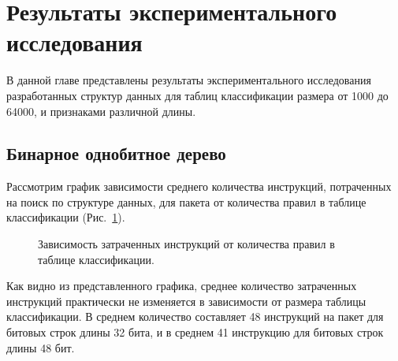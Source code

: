 \documentclass[a4paper, 12pt, titlepage, finall]{extreport}
\begin{document}
    \section{Результаты экспериментального исследования}
        В данной главе представлены результаты экспериментального исследования разработанных структур данных для таблиц классификации размера от 1000 до 64000, 
        и признаками различной длины.
        \subsection{Бинарное однобитное дерево}
            Рассмотрим график зависимости среднего количества инструкций, потраченных на поиск по структуре данных, для пакета от количества правил в таблице классификации (Рис.~\ref{graph:btinst}).
            \begin{figure}[!htbp]
                \centering
                \captionsetup{justification=centering}
                \caption{Зависимость затраченных инструкций от количества правил в таблице классификации.}
                \label{graph:btinst}
            \end{figure}
            Как видно из представленного графика, среднее количество затраченных инструкций практически не изменяется в зависимости от размера таблицы классификации. 
            В среднем количество составляет 48 инструкций на пакет для битовых строк длины 32 бита, и в среднем 41 инструкцию для битовых строк длины 48 бит.
\end{document}
